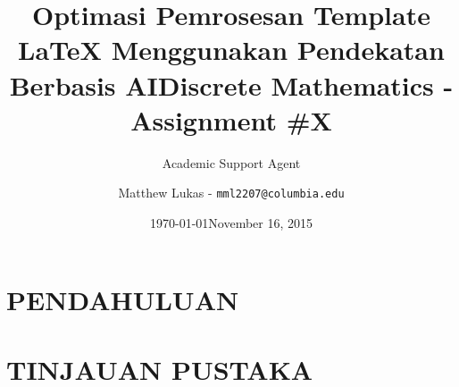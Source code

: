 \documentclass{article}
\title{Optimasi Pemrosesan Template LaTeX Menggunakan Pendekatan Berbasis AI}
\author{Academic Support Agent}
\date{\today}
\begin{document}
\maketitle

\begin{abstract}

\end{abstract}

\chapter{PENDAHULUAN}


\chapter{TINJAUAN PUSTAKA}


\usepackage{geometry}                		%
\geometry{letterpaper}                   		%
\usepackage[parfill]{parskip}    			%
\usepackage{graphicx}				%
\usepackage{amssymb}
\usepackage{mathtools}
\usepackage{enumerate}
\usepackage{tikz}

\usetikzlibrary{arrows}

\def\firstcircle{(90:1.75cm) circle (2.5cm)}
\def\secondcircle{(210:1.75cm) circle (2.5cm)}
\def\thirdcircle{(330:1.75cm) circle (2.5cm)}




\title{Discrete Mathematics - Assignment \#X}
\author{Matthew Lukas - \texttt{mml2207@columbia.edu}}
\date{November 16, 2015}							%
\end{document}
